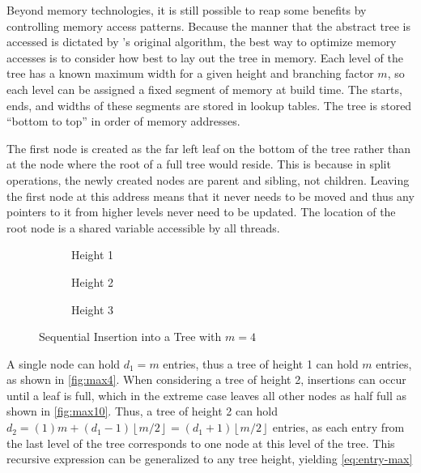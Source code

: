 Beyond memory technologies, it is still possible to reap some benefits by
controlling memory access patterns. Because the manner that the abstract tree is
accessed is dictated by \citeauthor{b-link}'s original algorithm, the best way
to optimize memory accesses is to consider how best to lay out the tree in
memory.
%
Each level of the tree has a known maximum width for a given height and
branching factor $m$, so each level can be assigned a fixed segment of memory at
build time. The starts, ends, and widths of these segments are stored in lookup
tables. The tree is stored ``bottom to top'' in order of memory addresses.

The first node is created as the far left leaf on the bottom of the tree rather
than at the node where the root of a full tree would reside. This is because in
split operations, the newly created nodes are parent and sibling, not children.
Leaving the first node at this address means that it never needs to be moved and
thus any pointers to it from higher levels never need to be updated. The
location of the root node is a shared variable accessible by all threads.

\begin{figure}[h]
	\centering
	\begin{subfigure}{6em}
		\centering
		
		\caption{Height 1}
		\label{fig:max4}
	\end{subfigure}
	\begin{subfigure}{15em}
		\centering
		
		\caption{Height 2}
		\label{fig:max10}
	\end{subfigure}
	\begin{subfigure}{\textwidth}
		\centering
		
		\caption{Height 3}
		\label{fig:max22}
	\end{subfigure}
	\caption{Sequential Insertion into a Tree with $m=4$}
	\label{fig:memory-hierarchy}
\end{figure}

A single node can hold $d_1=m$ entries, thus a tree of height 1 can hold $m$
entries, as shown in \autoref{fig:max4}. When considering a tree of height 2,
insertions can occur until a leaf is full, which in the extreme case leaves all
other nodes as half full as shown in \autoref{fig:max10}. Thus, a tree of height
2 can hold $d_2 = (1)m + (d_1-1)\left\lfloor{m/2}\right\rfloor =
(d_1+1)\left\lfloor{m/2}\right\rfloor$ entries, as each entry from the last
level of the tree corresponds to one node at this level of the tree.
%
This recursive expression can be generalized to any tree height, yielding
\autoref{eq:entry-max}

